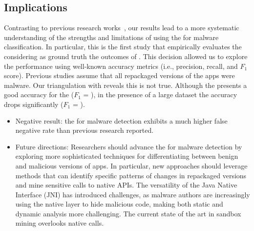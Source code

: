 \subsection{Implications}\label{sec:implications} 

Contrasting to previous research works~\cite{DBLP:conf/wcre/BaoLL18,DBLP:conf/iceccs/LeB0GL18,DBLP:journals/jss/CostaMMSSBNR22},
our results 
lead to a more systematic understanding
of the strengths and limitations of using the \mas
for malware classification. In particular, this is the
first study that empirically evaluates the \mas
considering as ground truth the outcomes
of \vt. This decision allowed us to explore the
\mas performance using well-known accuracy metrics (i.e., precision, recall, and
$F_1$ score). Previous studies assume that all repackaged versions of the
apps were malware. Our triangulation with \vt reveals this is not true. Although
the \mas presents a good accuracy for the \sds ($F_1$ = \fscoreSmall), 
in the presence of a large dataset the \mas accuracy drops significantly ($F_1$ = \fscore). 


\begin{itemize}
  \item Negative result: the \mas for malware detection exhibits a much higher false negative rate than previous research reported. 

  \item Future directions: Researchers should advance the \mas for malware detection by exploring more sophisticated techniques for differentiating between benign and malicious versions of apps. In particular, new approaches should leverage methods that can identify specific patterns of changes in repackaged versions and mine sensitive calls to native APIs. The versatility of the Java Native Interface (JNI) has introduced challenges, as malware authors are increasingly using the native layer to hide malicious code, making both static and dynamic analysis more challenging. The current state of the art in sandbox mining overlooks native calls.
  

    
\end{itemize}  


